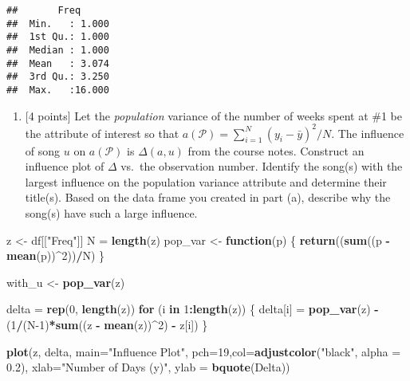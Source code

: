 \documentclass[
]{article}
\newenvironment{Shaded}{\begin{snugshade}}{\end{snugshade}}
\newcommand{\AttributeTok}[1]{\textcolor[rgb]{0.13,0.29,0.53}{#1}}
\newcommand{\ControlFlowTok}[1]{\textcolor[rgb]{0.13,0.29,0.53}{\textbf{#1}}}
\newcommand{\DecValTok}[1]{\textcolor[rgb]{0.00,0.00,0.81}{#1}}
\newcommand{\FloatTok}[1]{\textcolor[rgb]{0.00,0.00,0.81}{#1}}
\newcommand{\FunctionTok}[1]{\textcolor[rgb]{0.13,0.29,0.53}{\textbf{#1}}}
\newcommand{\NormalTok}[1]{#1}
\newcommand{\OtherTok}[1]{\textcolor[rgb]{0.56,0.35,0.01}{#1}}
\newcommand{\SpecialCharTok}[1]{\textcolor[rgb]{0.81,0.36,0.00}{\textbf{#1}}}
\newcommand{\StringTok}[1]{\textcolor[rgb]{0.31,0.60,0.02}{#1}}
\providecommand{\tightlist}{%
  \setlength{\itemsep}{0pt}\setlength{\parskip}{0pt}}
\begin{document}
\begin{verbatim}
##       Freq       
##  Min.   : 1.000  
##  1st Qu.: 1.000  
##  Median : 1.000  
##  Mean   : 3.074  
##  3rd Qu.: 3.250  
##  Max.   :16.000
\end{verbatim}

\begin{enumerate}
\def\labelenumi{(\alph{enumi})}
\setcounter{enumi}{1}
\tightlist
\item
  {[}4 points{]} Let the \emph{population} variance of the number of
  weeks spent at \#1 be the attribute of interest so that
  \(a(\mathcal{P})=\sum_{i = 1}^N(y_i - \bar{y})^2/N\). The influence of
  song \(u\) on \(a(\mathcal{P})\) is \(\Delta(a,u)\) from the course
  notes. Construct an influence plot of \(\Delta\) vs.~the observation
  number. Identify the song(s) with the largest influence on the
  population variance attribute and determine their title(s). Based on
  the data frame you created in part (a), describe why the song(s) have
  such a large influence.
\end{enumerate}

\begin{Shaded}
\begin{Highlighting}[]
\NormalTok{z }\OtherTok{\textless{}{-}}\NormalTok{ df[[}\StringTok{"Freq"}\NormalTok{]]}
\NormalTok{N }\OtherTok{=} \FunctionTok{length}\NormalTok{(z)}
\NormalTok{pop\_var }\OtherTok{\textless{}{-}} \ControlFlowTok{function}\NormalTok{(p) \{}
  \FunctionTok{return}\NormalTok{((}\FunctionTok{sum}\NormalTok{((p }\SpecialCharTok{{-}} \FunctionTok{mean}\NormalTok{(p))}\SpecialCharTok{\^{}}\DecValTok{2}\NormalTok{))}\SpecialCharTok{/}\NormalTok{N)}
\NormalTok{\}}

\NormalTok{with\_u }\OtherTok{\textless{}{-}} \FunctionTok{pop\_var}\NormalTok{(z)}

\NormalTok{delta }\OtherTok{=} \FunctionTok{rep}\NormalTok{(}\DecValTok{0}\NormalTok{, }\FunctionTok{length}\NormalTok{(z))}
\ControlFlowTok{for}\NormalTok{ (i }\ControlFlowTok{in} \DecValTok{1}\SpecialCharTok{:}\FunctionTok{length}\NormalTok{(z)) \{}
\NormalTok{  delta[i] }\OtherTok{=} \FunctionTok{pop\_var}\NormalTok{(z) }\SpecialCharTok{{-}}\NormalTok{ (}\DecValTok{1}\SpecialCharTok{/}\NormalTok{(N}\DecValTok{{-}1}\NormalTok{)}\SpecialCharTok{*}\FunctionTok{sum}\NormalTok{((z }\SpecialCharTok{{-}} \FunctionTok{mean}\NormalTok{(z))}\SpecialCharTok{\^{}}\DecValTok{2}\NormalTok{) }\SpecialCharTok{{-}}\NormalTok{ z[i])}
\NormalTok{\}}

\FunctionTok{plot}\NormalTok{(z, delta, }\AttributeTok{main=}\StringTok{"Influence Plot"}\NormalTok{, }\AttributeTok{pch=}\DecValTok{19}\NormalTok{,}\AttributeTok{col=}\FunctionTok{adjustcolor}\NormalTok{(}\StringTok{"black"}\NormalTok{, }\AttributeTok{alpha =} \FloatTok{0.2}\NormalTok{),}
     \AttributeTok{xlab=}\StringTok{"Number of Days (y)"}\NormalTok{, }\AttributeTok{ylab =} \FunctionTok{bquote}\NormalTok{(Delta))}
\end{Highlighting}
\end{Shaded}
\end{document}
